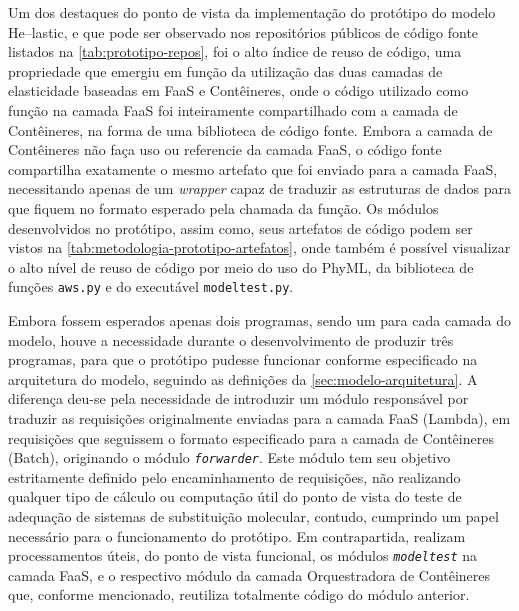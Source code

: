\documentclass[english,brazilian]{UNISINOSmonografia} %
\begin{document}
Um dos destaques do ponto de vista da implementação do protótipo do modelo \textsf{He}--lastic, e que pode ser observado nos repositórios públicos de código fonte listados na \autoref{tab:prototipo-repos}, foi o alto índice de reuso de código, uma propriedade que emergiu em função da utilização das duas camadas de elasticidade baseadas em FaaS e Contêineres, onde o código utilizado como função na camada FaaS foi inteiramente compartilhado com a camada de Contêineres, na forma de uma biblioteca de código fonte.
%
Embora a camada de Contêineres não faça uso ou referencie da camada FaaS, o código fonte compartilha exatamente o mesmo artefato que foi enviado para a camada FaaS, necessitando apenas de um \textit{wrapper} capaz de traduzir as estruturas de dados para que fiquem no formato esperado pela chamada da função.
%
Os módulos desenvolvidos no protótipo, assim como, seus artefatos de código podem ser vistos na \autoref{tab:metodologia-prototipo-artefatos}, onde também é possível visualizar o alto nível de reuso de código por meio do uso do PhyML, da biblioteca de funções \texttt{aws.py} e do executável \texttt{modeltest.py}.


Embora fossem esperados apenas dois programas, sendo um para cada camada do modelo, houve a necessidade durante o desenvolvimento de produzir três programas, para que o protótipo pudesse funcionar conforme especificado na arquitetura do modelo, seguindo as definições da \autoref{sec:modelo-arquitetura}.
%
A diferença deu-se pela necessidade de introduzir um módulo responsável por traduzir as requisições originalmente enviadas para a camada FaaS (Lambda), em requisições que seguissem o formato especificado para a camada de Contêineres (Batch), originando o módulo \textit{\texttt{forwarder}}.
%
Este módulo tem seu objetivo estritamente definido pelo encaminhamento de requisições, não realizando qualquer tipo de cálculo ou computação útil do ponto de vista do teste de adequação de sistemas de substituição molecular, contudo, cumprindo um papel necessário para o funcionamento do protótipo.
%
Em contrapartida, realizam processamentos úteis, do ponto de vista funcional, os módulos \textit{\texttt{modeltest}} na camada FaaS, e o respectivo módulo da camada Orquestradora de Contêineres que, conforme mencionado, reutiliza totalmente código do módulo anterior.
\end{document}

